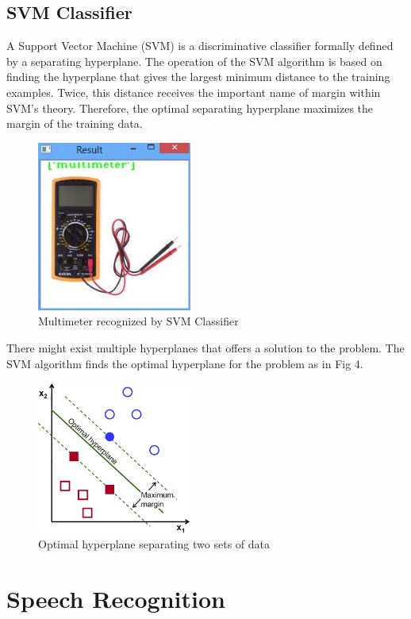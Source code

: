 \documentclass[journal,twoside]{IEEEtran}
\begin{document}
\subsection{SVM Classifier}

A Support Vector Machine (SVM) is a discriminative
classifier formally defined by a separating hyperplane. The
operation of the SVM algorithm is based on finding the
hyperplane that gives the largest minimum distance to the
training examples. Twice, this distance receives the important
name of margin within SVM's theory. Therefore, the optimal
separating hyperplane maximizes the margin of the training
data. \cite{OpenCV2016}

\begin{figure}[htb]
\centering
\includegraphics[width=2.0in]{figure3}
\caption{Multimeter recognized by SVM Classifier}
\label{fig:figure3}
\end{figure}

There might exist multiple hyperplanes that offers a
solution to the problem. The SVM algorithm finds the optimal
hyperplane for the problem as in Fig 4.

\begin{figure}[H]
\centering
\includegraphics[width=2.0in]{figure4}
\caption{Optimal hyperplane separating two sets of data}
\label{fig:figure4}
\end{figure}

\section{Speech Recognition}
\end{document}
